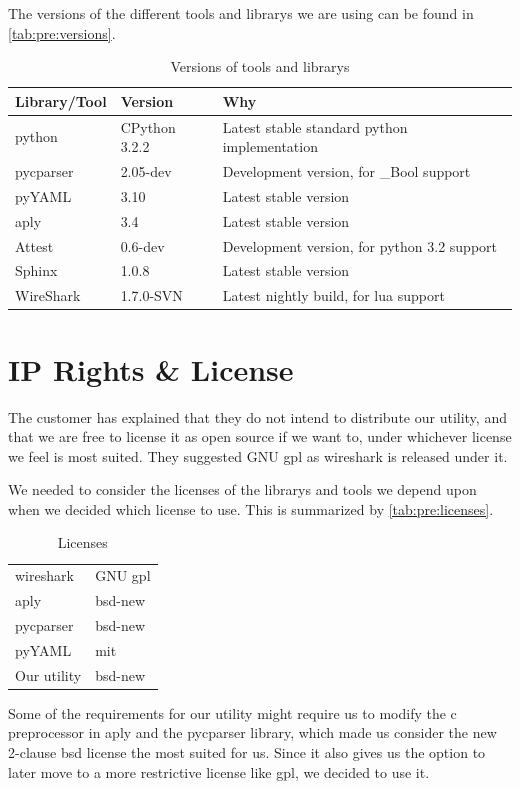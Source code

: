 The versions of the different tools and \glspl{library} we are using can be found in
\autoref{tab:pre:versions}.
\begin{table}[!h] \footnotesize \center
\vspace{-10pt}
\caption{Versions of tools and \glspl{library}\label{tab:pre:versions}}
\begin{tabular}{l l l}
	\toprule
	Library/Tool & Version & Why \\
	\midrule
	\Gls{python} & CPython 3.2.2 & Latest stable standard \Gls{python} implementation \\
	\gls{pycparser} & 2.05-dev & Development version, for \_Bool support \\
	pyYAML & 3.10 & Latest stable version \\
	\Gls{aply} & 3.4 & Latest stable version \\
	Attest & 0.6-dev & Development version, for \Gls{python} 3.2 support \\
	Sphinx & 1.0.8 & Latest stable version \\
	WireShark & 1.7.0-SVN & Latest nightly build, for \Gls{lua} support \\
	\bottomrule
\end{tabular}
\vspace{-10pt}
\end{table}


\section{IP Rights \& License}
\label{sec:pre:license}
The customer has explained that they do not intend to distribute our \gls{utility},
and that we are free to license it as open source if we want to, under
whichever license we feel is most suited. They suggested GNU \Gls{gpl} as \Gls{wireshark}
is released under it.

We needed to consider the licenses of the \glspl{library} and tools we depend upon
when we decided which license to use. This is summarized by
\autoref{tab:pre:licenses}.
\begin{table}[!h] \footnotesize \center
\vspace{-20pt}
\caption{Licenses\label{tab:pre:licenses}}
\begin{tabular}{l l}
	\toprule
	\Gls{wireshark} & GNU \Gls{gpl} \\
	\Gls{aply} & \Gls{bsd}-new \\
	\gls{pycparser} & \Gls{bsd}-new \\
	pyYAML & \Gls{mit} \\
	\midrule
	Our \gls{utility} & \Gls{bsd}-new \\
	\bottomrule
\end{tabular}
\vspace{-10pt}
\end{table}

\noindent Some of the requirements for our \gls{utility} might require us to modify
the \Gls{c} \gls{preprocessor} in \Gls{aply} and the \gls{pycparser} \gls{library}, which made us consider
the new 2-clause \Gls{bsd} license the most suited for us. Since it also gives us the
option to later move to a more restrictive license like \Gls{gpl}, we decided to use
it.
